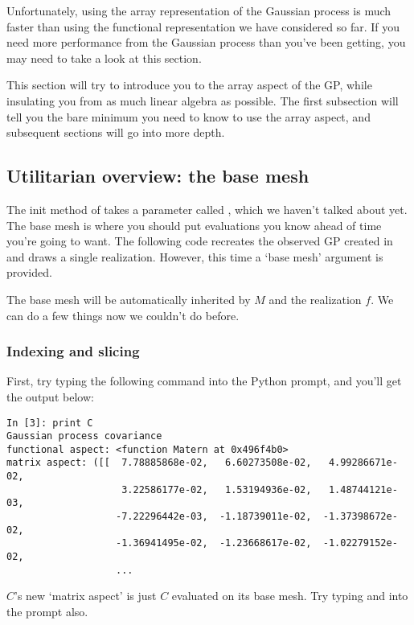 \documentclass{manual}
\begin{document}
Unfortunately, using the array representation of the Gaussian process is much faster than using the functional representation we have considered so far. If you need more performance from the Gaussian process than you've been getting, you may need to take a look at this section.

This section will try to introduce you to the array aspect of the GP, while insulating you from as much linear algebra as possible. The first subsection will tell you the bare minimum you need to know to use the array aspect, and subsequent sections will go into more depth.

\subsection{Utilitarian overview: the base mesh}

The init method of  takes a parameter called , which we haven't talked about yet. The base mesh is where you should put evaluations you know ahead of time you're going to want. The following code recreates the observed GP created in  and draws a single realization. However, this time a `base mesh' argument is provided.


The base mesh will be automatically inherited by $M$ and the realization $f$. We can do a few things now we couldn't do before.

\subsubsection{Indexing and slicing}\label{subsub:indexslice}
First, try typing the following command into the Python prompt, and you'll get the output below:
\begin{verbatim}
In [3]: print C
Gaussian process covariance
functional aspect: <function Matern at 0x496f4b0>
matrix aspect: ([[  7.78885868e-02,   6.60273508e-02,   4.99286671e-02,
                    3.22586177e-02,   1.53194936e-02,   1.48744121e-03,
                   -7.22296442e-03,  -1.18739011e-02,  -1.37398672e-02,
                   -1.36941495e-02,  -1.23668617e-02,  -1.02279152e-02,
                   ...
\end{verbatim}
$C$'s new `matrix aspect' is just $C$ evaluated on its base mesh. Try typing  and  into the prompt also. 
\end{document}
